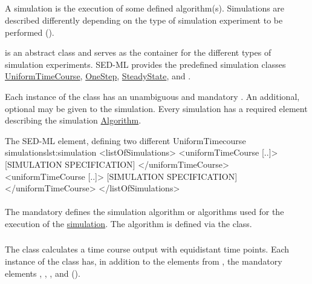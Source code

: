 \subsection{}
\label{class:simulation}
A simulation is the execution of some defined algorithm(s). Simulations are described differently depending on the type of simulation experiment to be performed (). 


 is an abstract class and serves as the container for the different types of simulation experiments. SED-ML \currentLV provides the predefined simulation classes \hyperref[class:uniformTimeCourse]{UniformTimeCourse}, \hyperref[class:oneStep]{OneStep}, \hyperref[class:steadyState]{SteadyState}, and \Analysis. 

Each instance of the  class has an unambiguous and mandatory \hyperref[sec:id]{}. An additional, optional \hyperref[sec:name]{} may be given to the simulation. Every simulation has a required element \hyperref[class:algorithm]{} describing the simulation \hyperref[class:algorithm]{Algorithm}.

\begin{myXmlLst}{The SED-ML  element, defining two different UniformTimecourse simulations}{lst:simulation}
<listOfSimulations>
	<uniformTimeCourse [..]>
		[SIMULATION SPECIFICATION]
	</uniformTimeCourse>
	<uniformTimeCourse [..]>
		[SIMULATION SPECIFICATION]
	</uniformTimeCourse>
</listOfSimulations>
\end{myXmlLst}

\paragraph*{}
\label{sec:sim-algorithm}
The mandatory  defines the simulation algorithm or algorithms used for the execution of the \hyperref[class:simulation]{simulation}. The algorithm is defined via the \Algorithm class.


\subsubsection{}
\label{class:uniformTimeCourse}
The  class calculates a time course output with equidistant time points. Each instance of the  class has, in addition to the elements from \Simulation, the mandatory elements \hyperref[sec:initialTime]{}, \hyperref[sec:outputStartTime]{}, \hyperref[sec:outputEndTime]{}, and \hyperref[sec:numberOfSteps]{} ().

